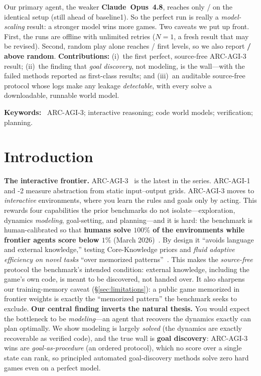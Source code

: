 \documentclass[11pt]{article}
\begin{document}
\begin{tcolorbox}[breakable, enhanced, colback=white, colframe=black!12,
  arc=3pt, boxrule=0.5pt, left=18pt, right=16pt, top=5pt, bottom=5pt,
  borderline west={3pt}{0pt}{cardblue}, drop fuzzy shadow=black!18]
Our primary agent, the weaker \textbf{Claude~Opus~4.8}, reaches only \ArcSFGames/\ArcUnionGames{} on the
identical setup (still ahead of baseline1). So the perfect run is really a \emph{model-scaling} result: a
stronger model wins more games.
Two caveats we put up front. First, the runs are offline with unlimited retries ($N{=}1$, a fresh result
that may be revised). Second, random play alone reaches \ArcRandomGeqOne/\ArcUnionGames{} first levels, so
we also report \textbf{\ArcAboveRandom/\ArcUnionGames{} above random}. \textbf{Contributions:} (i)~the
first perfect, source-free ARC-AGI-3 result; (ii)~the finding that \emph{goal discovery}, not modeling, is
the wall---with the failed methods reported as first-class results; and (iii)~an auditable source-free
protocol whose logs make any leakage \emph{detectable}, with every solve a downloadable, runnable world
model.

\noindent\textbf{Keywords:}~%
ARC-AGI-3; interactive reasoning; code world models; verification; planning.
\end{tcolorbox}

\section{Introduction}

\textbf{The interactive frontier.} ARC-AGI-3~\cite{arcagi3_report} is the latest in the series. ARC-AGI-1 and -2 measure abstraction from static
input--output grids. ARC-AGI-3 moves to \emph{interactive} environments, where you learn the rules and
goals only by acting. This rewards four capabilities the prior benchmarks do not
isolate---exploration, dynamics \emph{modeling}, goal-setting, and planning---and it is hard:
the benchmark is human-calibrated so that \textbf{humans solve $100\%$ of the environments while
frontier agents score below $1\%$} (March 2026)~\cite{arcagi3_report}. By design it ``avoids language and
external knowledge,'' testing Core-Knowledge priors and \emph{fluid adaptive efficiency on novel tasks}
``over memorized patterns''~\cite{arcagi3_report}. This makes the \emph{source-free} protocol the
benchmark's intended condition: external knowledge, including the game's own code, is meant to be
discovered, not handed over. It also sharpens our training-memory caveat (\S\ref{sec:limitations}): a public
game memorized in frontier weights is exactly the ``memorized pattern'' the benchmark seeks to exclude.
\textbf{Our central finding inverts the natural thesis.} You would expect the bottleneck to be
\emph{modeling}---an agent that recovers the dynamics exactly can plan optimally. We show modeling is
largely \emph{solved} (the dynamics are exactly recoverable as verified code), and the true wall is
\textbf{goal discovery}: ARC-AGI-3 wins are \emph{goal-as-procedure} (an ordered protocol), which no score
over a single state can rank, so principled automated goal-discovery methods solve zero hard games even on a
perfect model.
\end{document}
